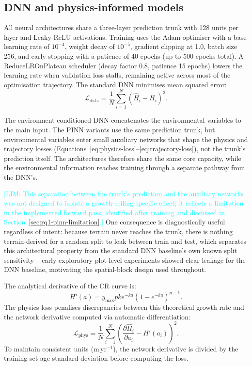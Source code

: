\documentclass[logo,msc,ai]{infthesis}           %
\newcommand{\limit}[1]{\textcolor{cyan}{[LIM: #1]}}
\begin{document}
\subsection{DNN and physics-informed models}
All neural architectures share a three-layer prediction trunk with 128 units per layer and Leaky-ReLU activations. Training uses the Adam optimiser with a base learning rate of $10^{-4}$, weight decay of $10^{-5}$, gradient clipping at 1.0, batch size 256, and early stopping with a patience of 40 epochs (up to 500 epochs total). A ReduceLROnPlateau scheduler (decay factor 0.8, patience 15 epochs) lowers the learning rate when validation loss stalls, remaining active across most of the optimisation trajectory. The standard DNN minimises mean squared error:
\begin{equation}
\mathcal{L}_{\mathrm{data}}=\frac{1}{N}\sum_{i=1}^{N}
\left(\hat H_i-H_i\right)^2.
\label{eq:data-loss}
\end{equation}

The environment-conditioned DNN concatenates the environmental variables to the main input. The PINN variants use the same prediction trunk, but environmental variables enter small auxiliary networks that shape the physics and trajectory losses (Equations~\ref{eq:physics-loss}--\ref{eq:trajectory-loss}), not the trunk's prediction itself. The architectures therefore share the same core capacity, while the environmental information reaches training through a separate pathway from the DNN's.

\limit{This separation between the trunk's prediction and the auxiliary networks was not designed to isolate a growth-ceiling-specific effect; it reflects a limitation in the implemented forward pass, identified after training and discussed in Section~\ref{sec:rq1-pinn-limitation}.} One consequence is diagnostically useful regardless of intent: because terrain never reaches the trunk, there is nothing terrain-derived for a random split to leak between train and test, which separates this architectural property from the standard DNN baseline's own known split sensitivity -- early exploratory plot-level experiments showed clear leakage for the DNN baseline, motivating the spatial-block design used throughout.

The analytical derivative of the CR curve is:
\begin{equation}
H'(a)=y_{\max}pk e^{-ka}\left(1-e^{-ka}\right)^{p-1}.
\label{eq:cr-derivative}
\end{equation}
The physics loss penalises discrepancies between this theoretical growth rate and the network derivative computed via automatic differentiation:
\begin{equation}
\mathcal{L}_{\mathrm{phys}}=\frac{1}{N}\sum_{i=1}^{N}
\left(\frac{\partial\hat H_i}{\partial a_i}-H'(a_i)\right)^2.
\label{eq:physics-loss}
\end{equation}
To maintain consistent units ($\mathrm{m\,yr^{-1}}$), the network derivative is divided by the training-set age standard deviation before computing the loss.
\end{document}

